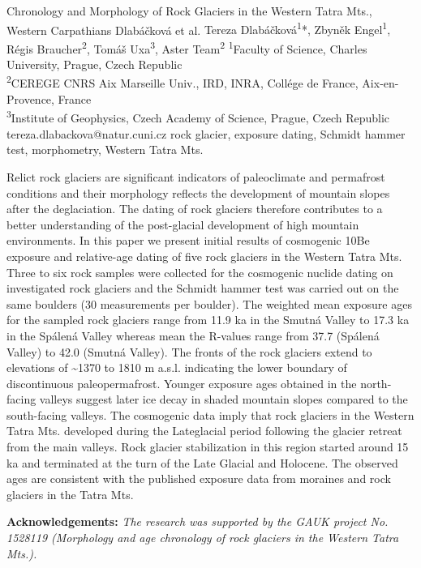 \abstract
{Chronology and Morphology of Rock Glaciers in the Western Tatra Mts., Western Carpathians} 
{Dlabáčková et al.} 
{Tereza Dlabáčková\textsuperscript{1}*, Zbyněk Engel\textsuperscript{1}, Régis Braucher\textsuperscript{2}, Tomáš Uxa\textsuperscript{3}, Aster Team\textsuperscript{2}} 
{\POtag} 
{
\textsuperscript{1}Faculty of Science, Charles University, Prague, Czech Republic \\
\textsuperscript{2}CEREGE CNRS Aix Marseille Univ., IRD, INRA, Collége de France, Aix-en-Provence, France\\
\textsuperscript{3}Institute of Geophysics, Czech Academy of Science, Prague, Czech Republic
}
{tereza.dlabackova@natur.cuni.cz}  %
{rock glacier, exposure dating, Schmidt hammer test, morphometry, Western Tatra Mts.}
{Relict rock glaciers are significant indicators of paleoclimate and permafrost conditions and their morphology reflects the development of mountain slopes after the deglaciation. The dating of rock glaciers therefore contributes to a better understanding of the post-glacial development of high mountain environments. In this paper we present initial results of cosmogenic 10Be exposure and relative-age dating of five rock glaciers in the Western Tatra Mts. Three to six rock samples were collected for the cosmogenic nuclide dating on investigated rock glaciers and the Schmidt hammer test was carried out on the same boulders (30 measurements per boulder). The weighted mean exposure ages for the sampled rock glaciers range from 11.9 ka in the Smutná Valley to 17.3 ka in the Spálená Valley whereas mean the R-values range from 37.7 (Spálená Valley) to 42.0 (Smutná Valley). The fronts of the rock glaciers extend to elevations of \textasciitilde1370 to 1810 m a.s.l. indicating the lower boundary of discontinuous paleopermafrost. Younger exposure ages obtained in the north-facing valleys suggest later ice decay in shaded mountain slopes compared to the south-facing valleys. The cosmogenic data imply that rock glaciers in the Western Tatra Mts. developed during the Lateglacial period following the glacier retreat from the main valleys.  Rock glacier stabilization in this region started around 15 ka and terminated at the turn of the Late Glacial and Holocene. The observed ages are consistent with the published exposure data from moraines and rock glaciers in the Tatra Mts.

\vspace{0.5em}
\noindent
\textbf{Acknowledgements:}
\textit{The research was supported by the GAUK project No. 1528119 (Morphology and age chronology of rock glaciers in the Western Tatra Mts.).}
	
}
{
}

